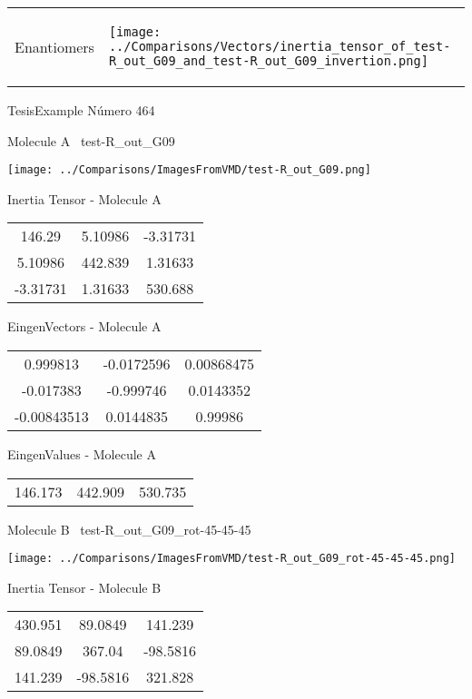 \vtab[-5mm]
\begin{tabular}{*{2}{m{}}}
\begin{center}
\textcolor{NavyBlue}{\Large Enantiomers}
\end{center}
&
\begin{center}
\texttt{[image: ../Comparisons/Vectors/inertia\_tensor\_of\_test-R\_out\_G09\_and\_test-R\_out\_G09\_invertion.png]}
\end{center}
\end{tabular}

 \newpage

\vtab[-3cm]
\begin{center}
{\large TesisExample \tab Número 464}
\end{center}
\begin{multicols}{2}
\begin{center}

Molecule A \
test-R\_out\_G09

\texttt{[image: ../Comparisons/ImagesFromVMD/test-R\_out\_G09.png]}

Inertia Tensor - Molecule A \\
\begin{tabular}{|c c c|}
146.29	 & 	5.10986	 & 	-3.31731	 \\
5.10986	 & 	442.839	 & 	1.31633	 \\
-3.31731	 & 	1.31633	 & 	530.688
\end{tabular}

\vtab
 EingenVectors - Molecule A     \\
\begin{tabular}{|c c c|}
0.999813	 & 	-0.0172596	 & 	0.00868475	 \\
-0.017383	 & 	-0.999746	 & 	0.0143352	 \\
-0.00843513	 & 	0.0144835	 & 	0.99986
\end{tabular}

\vtab
 EingenValues - Molecule A     \\
\begin{tabular}{|c c c|}
146.173	 & 	442.909	 & 	530.735	 \\
\end{tabular}
\columnbreak

Molecule B \
test-R\_out\_G09\_rot-45-45-45

\texttt{[image: ../Comparisons/ImagesFromVMD/test-R\_out\_G09\_rot-45-45-45.png]}

Inertia Tensor - Molecule B \\
\begin{tabular}{|c c c|}
430.951	 & 	89.0849	 & 	141.239	 \\
89.0849	 & 	367.04	 & 	-98.5816	 \\
141.239	 & 	-98.5816	 & 	321.828
\end{tabular}


\end{center}
\end{multicols}
